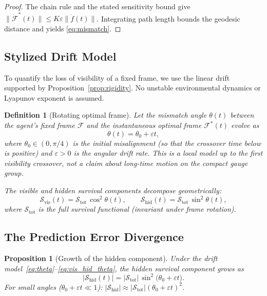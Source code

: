 \documentclass[12pt]{article}
\newtheorem{proposition}[theorem]{Proposition}
\newtheorem{definition}[theorem]{Definition}
\begin{document}
\begin{proof}
The chain rule and the stated sensitivity bound give
$\lVert\dot{\mathcal F}^*(t)\rVert
\leq K\varepsilon\lVert\dot f(t)\rVert$.
Integrating path length bounds the geodesic distance and yields
\eqref{eq:mismatch}.
\end{proof}

\subsection{Stylized Drift Model}
\label{subsec:drift_model}

To quantify the loss of visibility of a fixed frame, we use the linear
drift supported by Proposition~\ref{prop:rigidity}.  No unstable
environmental dynamics or Lyapunov exponent is assumed.

\begin{definition}[Rotating optimal frame]
\label{def:drift}
Let the mismatch angle $\theta(t)$ between the agent's
fixed frame $\mathcal{F}$ and the instantaneous optimal
frame $\mathcal{F}^*(t)$ evolve as
\begin{equation}
\label{eq:theta}
\theta(t) = \theta_0+\varepsilon t,
\end{equation}
where $\theta_0 \in (0, \pi/4)$ is the initial misalignment
(so that the crossover time below is positive) and
$\varepsilon>0$ is the angular drift rate.  This is a local model up to
the first visibility crossover, not a claim about long-time motion on
the compact gauge group.

The visible and hidden survival components decompose
geometrically:
\begin{equation}
\label{eq:vis_hid_theta}
\mathcal{S}_{\mathrm{vis}}(t)
= \mathcal{S}_{\mathrm{tot}}\,\cos^2\theta(t),
\qquad
\mathcal{S}_{\mathrm{hid}}(t)
= \mathcal{S}_{\mathrm{tot}}\,\sin^2\theta(t),
\end{equation}
where $\mathcal{S}_{\mathrm{tot}}$ is the full survival
functional (invariant under frame rotation).
\end{definition}

\subsection{The Prediction Error Divergence}
\label{subsec:divergence}

\begin{proposition}[Growth of the hidden component]
\label{prop:divergence}
Under the drift model~\eqref{eq:theta}--\eqref{eq:vis_hid_theta},
the hidden survival component grows as
\begin{equation}
\label{eq:divergence}
\bigl|\mathcal{S}_{\mathrm{hid}}(t)\bigr|
= |\mathcal{S}_{\mathrm{tot}}|\,\sin^2\!\bigl(\theta_0+
  \varepsilon t\bigr).
\end{equation}
For small angles ($\theta_0+\varepsilon t \ll 1$):
$|\mathcal{S}_{\mathrm{hid}}| \approx
|\mathcal{S}_{\mathrm{tot}}|(\theta_0+\varepsilon t)^2$.
\end{proposition}
\end{document}
